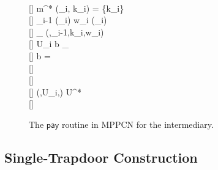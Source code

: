 \begin{figure*}[tb]
{{	\< \pcind \pcind \pcabort \< \\ [-0.15\baselineskip][]
	\< \pcind {} m^*  (\lid_i, k_i)   =  \cup \{k_i\} \< \\ [-0.15\baselineskip][]
	\< \pcind {} \lid_{i-1} \gets {}(\lid_i)  w_i \gets {}(\lid_i) \< \\ [-0.15\baselineskip][]
	\< \pcind {} \FF_{}  (\Release,\lid_{i-1},k_i,w_i) \< \\ [-0.15\baselineskip][]
	\< \pcind U_i  b  \FF_{} \< \\ [-0.15\baselineskip][]
	\< \pcind \pcif b = \bot \pcthen \< \\ [-0.15\baselineskip][]
	\< \pcind \pcind \pcabort \< \\ [-0.15\baselineskip][]
	\< \pcelse \< \\ [-0.15\baselineskip][]
	\< \pcind {} (,U_i,\bot)  U^* \< \\ [-0.15\baselineskip][]
	\< \pcind \pcabort
}}

\caption{The $\mathsf{pay}$ routine in MPPCN for the intermediary.}
\label{fig:mppcn-intermediary}
\end{figure*}

\subsection{Single-Trapdoor Construction}

